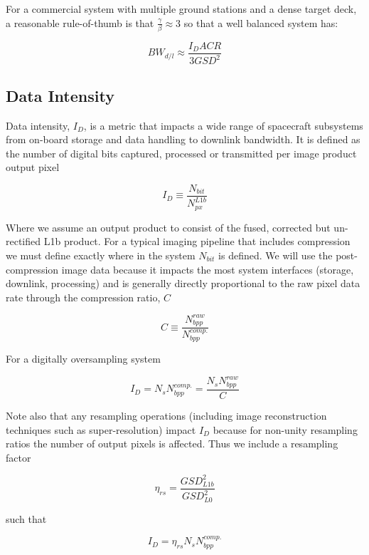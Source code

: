 \documentclass[10pt,journal]{IEEEtran}  %
\begin{document}
For a commercial system with multiple ground stations and a dense target deck, a reasonable rule-of-thumb is that $\frac{\gamma}{\beta} \approx 3$ so that a well balanced system has:

\begin{equation}
    BW_{d/l} \approx \frac{I_D ACR}{3 GSD^2}
\end{equation}

\subsection{Data Intensity}

Data intensity, $I_D$, is a metric that impacts a wide range of spacecraft subsystems from on-board storage and data handling to downlink bandwidth.  It is defined as the number of digital bits captured, processed or transmitted per image product output pixel

$$I_D \equiv \frac{N_{bit}}{N_{px}^{L1b}}$$

Where we assume an output product to consist of the fused, corrected but un-rectified L1b product. For a typical imaging pipeline that includes compression we must define exactly where in the system $N_{bit}$ is defined.  We will use the post-compression image data because it impacts the most system interfaces (storage, downlink, processing) and is generally directly proportional to the raw pixel data rate through the compression ratio, $C$

\begin{equation}
    \label{eq:compression}
    C \equiv \frac{N_{bpp}^{raw}}{N_{bpp}^{comp.}}
\end{equation}

For a digitally oversampling system

\begin{equation}
    I_D = N_s N_{bpp}^{comp.} = \frac{N_s N_{bpp}^{raw}}{C}
\end{equation}

Note also that any resampling operations (including image reconstruction techniques such as super-resolution) impact $I_D$ because for non-unity resampling ratios the number of output pixels is affected.  Thus we include a resampling factor

$${\eta}_{rs} = \frac{GSD_{L1b}^2}{GSD_{L0}^2}$$

such that

\begin{equation}
    \label{eq:I_D}
    I_D = {\eta}_{rs} N_s N_{bpp}^{comp.}
\end{equation}
\end{document}
